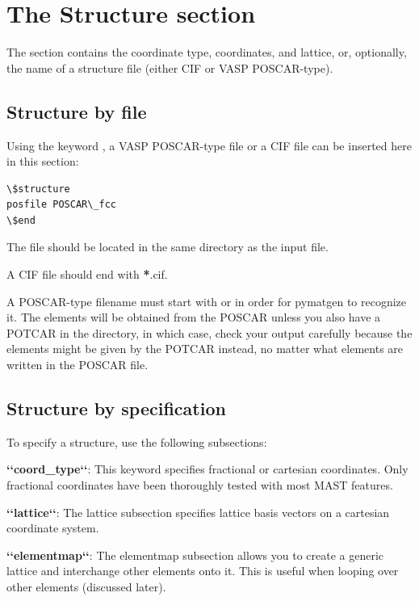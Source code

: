 \documentclass[letterpaper,10pt,english]{sphinxmanual}
\begin{document}
\section{The Structure section}
\label{3_0_inputfile:the-structure-section}
The  section contains the coordinate type, coordinates, and lattice, or, optionally, the name of a structure file (either CIF or VASP POSCAR-type).


\subsection{Structure by file}
\label{3_0_inputfile:structure-by-file}
Using the keyword , a VASP POSCAR-type file or a CIF file can be inserted here in this section:

\begin{Verbatim}[commandchars=\\\{\}]
\$structure
posfile POSCAR\_fcc
\$end
\end{Verbatim}

The file should be located in the same directory as the input file.

A CIF file should end with {\color{red}\bfseries{}*}.cif.

A POSCAR-type filename must start with  or  in order for pymatgen to recognize it. The elements will be obtained from the POSCAR unless you also have a POTCAR in the directory, in which case, check your output carefully because the elements might be given by the POTCAR instead, no matter what elements are written in the POSCAR file.


\subsection{Structure by specification}
\label{3_0_inputfile:structure-by-specification}
To specify a structure, use the following subsections:

\textbf{{}`{}`coord\_type{}`{}`}: This keyword specifies fractional or cartesian coordinates. Only fractional coordinates have been thoroughly tested with most MAST features.

\textbf{{}`{}`lattice{}`{}`}: The lattice subsection specifies lattice basis vectors on a cartesian coordinate system.

\textbf{{}`{}`elementmap{}`{}`}: The elementmap subsection allows you to create a generic lattice and interchange other elements onto it. This is useful when looping over other elements (discussed later).
\end{document}
